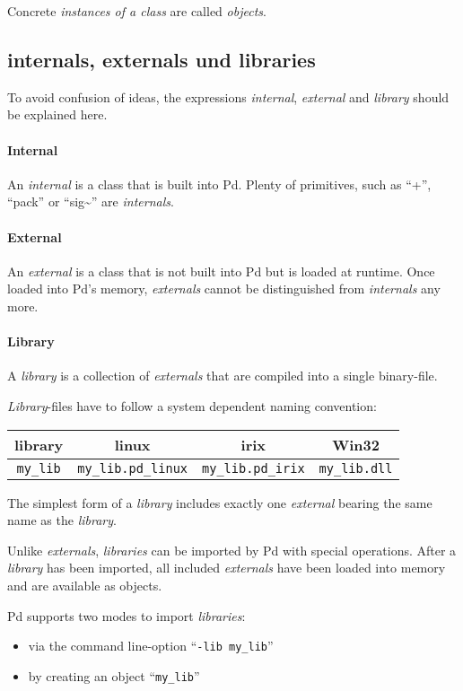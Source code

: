 \documentclass[12pt, a4paper,english,titlepage]{article}
\begin{document}
Concrete {\em instances of a class} are called {\em objects}.

\subsection{internals, externals und libraries}

To avoid confusion of ideas, the expressions {\em internal}, {\em external} and
{\em library} should be explained here.

\paragraph{Internal}
An {\em internal} is a class that is built into Pd.
Plenty of primitives, such as ``+'', ``pack'' or ``sig\~\/'' are {\em internals}.

\paragraph{External}
An {\em external} is a class that is not built into Pd but is loaded at runtime.
Once loaded into Pd's memory, {\em externals} cannot be distinguished from
{\em internals} any more.

\paragraph{Library}
A {\em library} is a collection of {\em externals} that are compiled into a 
single binary-file.

{\em Library}-files have to follow a system dependent naming convention:

\begin{tabular}{c||c|c|c}
library & linux&irix&Win32 \\
\hline
{\tt my\_lib}&{\tt  my\_lib.pd\_linux}&{\tt  my\_lib.pd\_irix}&
{\tt  my\_lib.dll}\\
\end{tabular}

The simplest form of a {\em library} includes exactly one {\em external}
bearing the same name as the {\em library}.

Unlike {\em externals}, {\em libraries} can be imported by Pd with special operations.
After a {\em library} has been imported,
all included {\em externals} have been loaded into memory and are available as objects.

Pd supports two modes to import {\em libraries}:

\begin{itemize}
\item via the command line-option ``{\tt -lib my\_lib}''
\item by creating an object ``{\tt my\_lib}''
\end{itemize}
\end{document}
